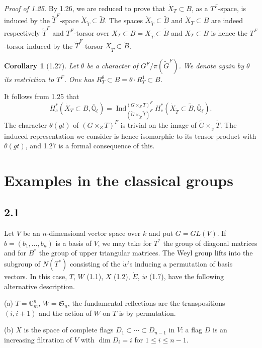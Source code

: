 \documentclass[11pt]{amsart}
\theoremstyle{plain}
\newtheorem{corollary}[theorem]{Corollary}
\theoremstyle{remark}
\DeclareMathOperator{\Ind}{Ind}
\begin{document}
\textit{Proof of 1.25.} By 1.26, we are reduced to prove that $\dot{X}_T \subset B$, as a $T^F$-space, is induced by the $\tilde{T}^F$-space $\dot{X}_{\tilde{T}} \subset \tilde{B}$. The spaces $\dot{X}_{\tilde{T}} \subset \tilde{B}$ and $\dot{X}_T \subset B$ are indeed respectively $\tilde{T}^F$ and $T^F$-torsor over $X_T \subset B = X_{\tilde{T}} \subset \tilde{B}$ and $X_T \subset B$ is hence the $T^F$-torsor induced by the $\tilde{T}^F$-torsor $\dot{X}_{\tilde{T}} \subset \tilde{B}$.

\begin{corollary}[1.27]
Let $\theta$ be a character of $G^F/\pi(\tilde{G}^F)$. We denote again by $\theta$ its restriction to $T^F$. One has $R_T^\theta \subset B = \theta \cdot R_T^1 \subset B$.
\end{corollary}

It follows from 1.25 that
\[
H_c^*(\dot{X}_T \subset B, \overline{\mathbb{Q}}_\ell) = \Ind_{(\tilde{G} \times_{\tilde{Z}} \tilde{T})^F}^{(G \times_Z T)^F} H_c^*(\dot{X}_{\tilde{T}} \subset \tilde{B}, \overline{\mathbb{Q}}_\ell).
\]
The character $\theta(gt)$ of $(G \times_Z T)^F$ is trivial on the image of $\tilde{G} \times_{\tilde{Z}} \tilde{T}$. The induced representation we consider is hence isomorphic to its tensor product with $\theta(gt)$, and 1.27 is a formal consequence of this.

\section{Examples in the classical groups}

\subsection{2.1} Let $V$ be an $n$-dimensional vector space over $k$ and put $G = GL(V)$. If $b = (b_1, \dots, b_n)$ is a basis of $V$, we may take for $T^*$ the group of diagonal matrices and for $B^*$ the group of upper triangular matrices. The Weyl group lifts into the subgroup of $N(T^*)$ consisting of the $\dot{w}$'s inducing a permutation of basis vectors. In this case, $T$, $W$ (1.1), $X$ (1.2), $\dot{E}$, $\dot{w}$ (1.7), have the following alternative description.

(a) $T = \mathbb{G}_m^n$, $W = \mathfrak{S}_n$, the fundamental reflections are the transpositions $(i, i+1)$ and the action of $W$ on $T$ is by permutation.

(b) $X$ is the space of complete flags $D_1 \subset \cdots \subset D_{n-1}$ in $V$: a flag $D$ is an increasing filtration of $V$ with $\dim D_i = i$ for $1 \le i \le n-1$.
\end{document}
